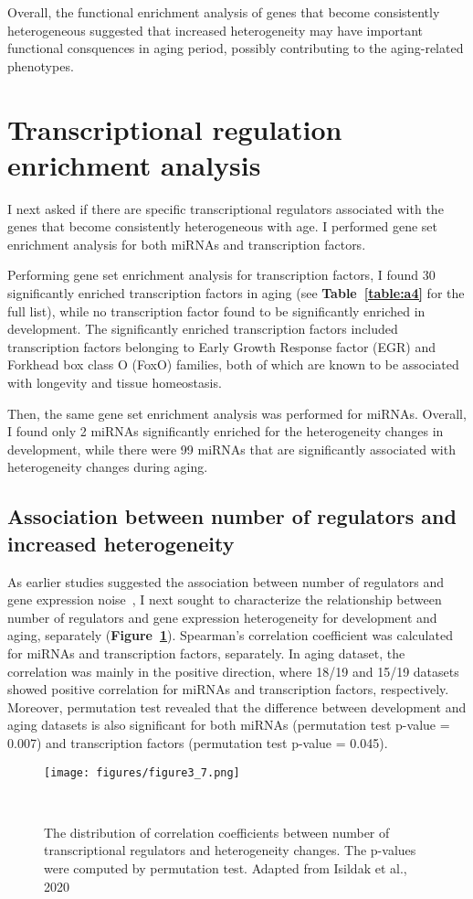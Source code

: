 Overall, the functional enrichment analysis of genes that become consistently heterogeneous suggested that 
increased heterogeneity may have important functional consquences in aging period, possibly contributing to the aging-related phenotypes.

\section{Transcriptional regulation enrichment analysis}
I next asked if there are specific transcriptional regulators associated with the genes that become consistently heterogeneous with age.
I performed gene set enrichment analysis for both miRNAs and transcription factors.

Performing gene set enrichment analysis for transcription factors, 
I found 30 significantly enriched transcription factors in aging (see \textbf{Table~\ref{table:a4}} for the full list),
while no transcription factor found to be significantly enriched in development. 
The significantly enriched transcription factors included transcription factors belonging to Early Growth Response factor (EGR) and Forkhead box class O (FoxO) families,
both of which are known to be associated with longevity and tissue homeostasis. 

Then, the same gene set enrichment analysis was performed for miRNAs. 
Overall, I found only 2 miRNAs significantly enriched for the heterogeneity changes in development, 
while there were 99 miRNAs that are significantly associated with heterogeneity changes during aging.

\subsection{Association between number of regulators and increased heterogeneity}
As earlier studies suggested the association between number of regulators and gene expression noise~\cite{Barroso2018, Sharon2014}, 
I next sought to characterize the relationship between number of regulators and gene expression heterogeneity for development and aging, separately (\textbf{Figure~\ref{fig:fig3.7}}).
Spearman's correlation coefficient was calculated for miRNAs and transcription factors, separately.
In aging dataset, the correlation was mainly in the positive direction, where 18/19 and 15/19 datasets showed positive correlation for miRNAs and transcription factors, respectively.
Moreover, permutation test revealed that the difference between development and aging datasets is also significant 
for both miRNAs (permutation test p-value = 0.007) and transcription factors (permutation test p-value = 0.045).

\begin{figure}[h]
    \centering
    \texttt{[image: figures/figure3\_7.png]}
    \caption{The distribution of correlation coefficients between number of transcriptional regulators and heterogeneity changes. 
    The p-values were computed by permutation test.
    Adapted from Isildak et al., 2020
    }~\label{fig:fig3.7}
\end{figure}